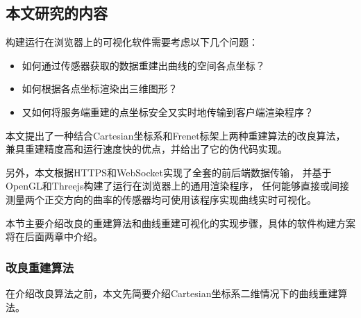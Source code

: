 \subsection{本文研究的内容}

构建运行在浏览器上的可视化软件需要考虑以下几个问题：

\begin{itemize}
\item 如何通过传感器获取的数据重建出曲线的空间各点坐标？
\item 如何根据各点坐标渲染出三维图形？
\item 又如何将服务端重建的点坐标安全又实时地传输到客户端渲染程序？
\end{itemize}

本文提出了一种结合Cartesian坐标系和Frenet标架上两种重建算法的改良算法，
兼具重建精度高和运行速度快的优点，并给出了它的伪代码实现。

另外，本文根据HTTPS和WebSocket实现了全套的前后端数据传输，
并基于OpenGL和Threejs构建了运行在浏览器上的通用渲染程序，
任何能够直接或间接测量两个正交方向的曲率的传感器均可使用该程序实现曲线实时可视化。

本节主要介绍改良的重建算法和曲线重建可视化的实现步骤，具体的软件构建方案将在后面两章中介绍。

\subsubsection{改良重建算法}

在介绍改良算法之前，本文先简要介绍Cartesian坐标系二维情况下的曲线重建算法。

